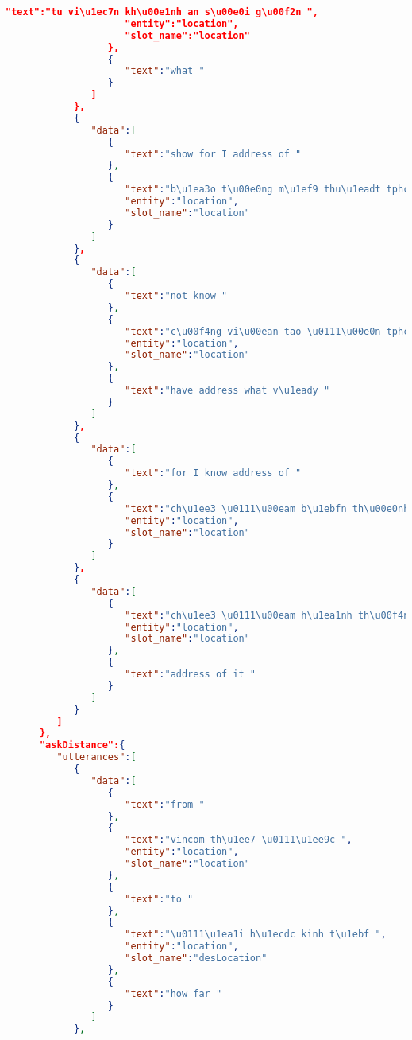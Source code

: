 \begin{lstlisting}[language=json,firstnumber=1]
                     "text":"tu vi\u1ec7n kh\u00e1nh an s\u00e0i g\u00f2n ",
                     "entity":"location",
                     "slot_name":"location"
                  },
                  {
                     "text":"what "
                  }
               ]
            },
            {
               "data":[
                  {
                     "text":"show for I address of "
                  },
                  {
                     "text":"b\u1ea3o t\u00e0ng m\u1ef9 thu\u1eadt tphcm ",
                     "entity":"location",
                     "slot_name":"location"
                  }
               ]
            },
            {
               "data":[
                  {
                     "text":"not know "
                  },
                  {
                     "text":"c\u00f4ng vi\u00ean tao \u0111\u00e0n tphcm ",
                     "entity":"location",
                     "slot_name":"location"
                  },
                  {
                     "text":"have address what v\u1eady "
                  }
               ]
            },
            {
               "data":[
                  {
                     "text":"for I know address of "
                  },
                  {
                     "text":"ch\u1ee3 \u0111\u00eam b\u1ebfn th\u00e0nh s\u00e0i g\u00f2n ",
                     "entity":"location",
                     "slot_name":"location"
                  }
               ]
            },
            {
               "data":[
                  {
                     "text":"ch\u1ee3 \u0111\u00eam h\u1ea1nh th\u00f4ng t\u00e2y ",
                     "entity":"location",
                     "slot_name":"location"
                  },
                  {
                     "text":"address of it "
                  }
               ]
            }
         ]
      },
      "askDistance":{
         "utterances":[
            {
               "data":[
                  {
                     "text":"from "
                  },
                  {
                     "text":"vincom th\u1ee7 \u0111\u1ee9c ",
                     "entity":"location",
                     "slot_name":"location"
                  },
                  {
                     "text":"to "
                  },
                  {
                     "text":"\u0111\u1ea1i h\u1ecdc kinh t\u1ebf ",
                     "entity":"location",
                     "slot_name":"desLocation"
                  },
                  {
                     "text":"how far "
                  }
               ]
            },

\end{lstlisting}
